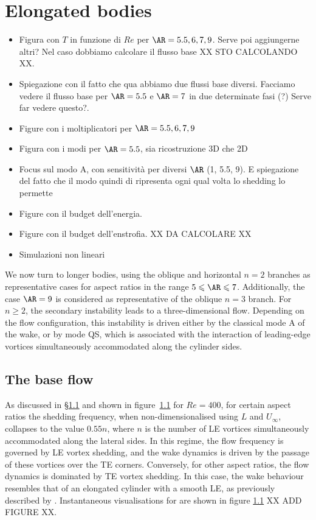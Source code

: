 \section{Elongated bodies}

\begin{itemize}
  \item Figura con $T$ in funzione di $Re$ per $\AR=5.5, 6, 7, 9$. Serve poi aggiungerne altri? Nel caso dobbiamo calcolare il flusso base XX STO CALCOLANDO XX.
  \item Spiegazione con il fatto che qua abbiamo due flussi base diversi. Facciamo vedere il flusso base per $\AR=5.5$ e $\AR=7$ in due determinate fasi (?) Serve far vedere questo?.  
  \item Figure con i moltiplicatori per $\AR=5.5, 6, 7, 9$
  \item Figura con i modi per $\AR=5.5$, sia ricostruzione 3D che 2D
  \item Focus sul modo A, con sensitività per diversi $\AR$ (1, 5.5, 9). E spiegazione del fatto che il modo quindi di ripresenta ogni qual volta lo shedding lo permette
  \item Figure con il budget dell'energia.
  \item Figure con il budget dell'enstrofia. XX DA CALCOLARE XX
  \item Simulazioni non lineari
\end{itemize}

We now turn to longer bodies, using the oblique and horizontal $n = 2$ branches as representative cases for aspect ratios in the range $5 \le \AR \le 7$. Additionally, the case $\AR = 9$ is considered as representative of the oblique $n = 3$ branch. For $n \ge 2$, the secondary instability leads to a three-dimensional flow. Depending on the flow configuration, this instability is driven either by the classical mode A of the wake, or by mode QS, which is associated with the interaction of leading-edge vortices simultaneously accommodated along the cylinder sides.

\subsection{The base flow}

As discussed in \S\ref{} and shown in figure~\ref{} for $Re = 400$, for certain aspect ratios the shedding frequency, when non-dimensionalised using $L$ and $U_\infty$, collapses to the value $0.55n$, where $n$ is the number of LE vortices simultaneously accommodated along the lateral sides. In this regime, the flow frequency is governed by LE vortex shedding, and the wake dynamics is driven by the passage of these vortices over the TE corners. Conversely, for other aspect ratios, the flow dynamics is dominated by TE vortex shedding. In this case, the wake behaviour resembles that of an elongated cylinder with a smooth LE, as previously described by \cite{chiarini-quadrio-auteri-2022}. Instantaneous visualisations for are shown in figure \ref{} XX ADD FIGURE XX. 

